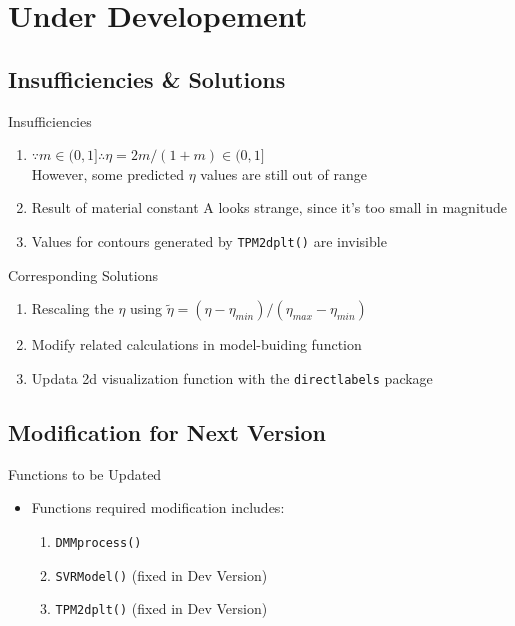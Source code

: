 \documentclass[11pt]{beamer}
\newcommand{\code}[1]{\texttt{#1}}
\begin{document}
\section{Under Developement}
\subsection{Insufficiencies \& Solutions}
\begin{frame}{Insufficiencies}
\begin{enumerate}
	\item $\because m \in (0, 1] \therefore \eta = 2m/(1+m) \in (0, 1]$\\ However, some predicted $\eta$ values are still out of range
	\singlespacing
	\item Result of material constant A looks strange, since it's too small in magnitude
	\singlespacing
	\item Values for contours generated by \code{TPM2dplt()}  are invisible
\end{enumerate}
\end{frame}

\begin{frame}{Corresponding Solutions}
\begin{enumerate}
	\item Rescaling the $\eta$ using $\tilde{\eta} = (\eta - \eta_{min})/(\eta_{max} - \eta_{min})$
	\singlespacing
	\item Modify related calculations in model-buiding function
	\singlespacing
	\item Updata 2d visualization function with the \code{directlabels} package
\end{enumerate}
\end{frame}

\subsection{Modification for Next Version}
\begin{frame}{Functions to be Updated}
\begin{itemize}
	\item Functions required modification includes:
	\singlespacing
	\begin{enumerate}
		\item \code{DMMprocess()}
		\singlespacing
		\item \code{SVRModel()} (fixed in Dev Version)
		\singlespacing
		\item \code{TPM2dplt()}  (fixed in Dev Version)
	\end{enumerate}
\end{itemize}
\end{frame}
\end{document}
